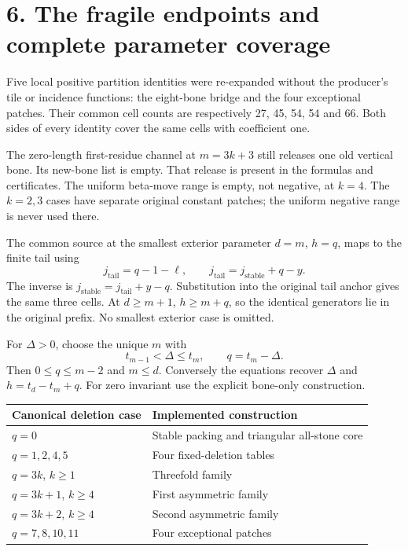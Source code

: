 \documentclass[
  11pt,
]{article}
\begin{document}
\section{6. The fragile endpoints and complete parameter
coverage}\label{the-fragile-endpoints-and-complete-parameter-coverage}

Five local positive partition identities were re-expanded without the
producer's tile or incidence functions: the eight-bone bridge and the
four exceptional patches. Their common cell counts are respectively 27,
45, 54, 54 and 66. Both sides of every identity cover the same cells
with coefficient one.

The zero-length first-residue channel at \(m=3k+3\) still releases one
old vertical bone. Its new-bone list is empty. That release is present
in the formulas and certificates. The uniform beta-move range is empty,
not negative, at \(k=4\). The \(k=2,3\) cases have separate original
constant patches; the uniform negative range is never used there.

The common source at the smallest exterior parameter \(d=m\), \(h=q\),
maps to the finite tail using \[
j_{\mathrm{tail}}=q-1-\ell,
\qquad
j_{\mathrm{tail}}=j_{\mathrm{stable}}+q-y.
\] The inverse is \(j_{\mathrm{stable}}=j_{\mathrm{tail}}+y-q\).
Substitution into the original tail anchor gives the same three cells.
At \(d\ge m+1\), \(h\ge m+q\), so the identical generators lie in the
original prefix. No smallest exterior case is omitted.

For \(\Delta>0\), choose the unique \(m\) with \[
t_{m-1}<\Delta\le t_m,
\qquad q=t_m-\Delta.
\] Then \(0\le q\le m-2\) and \(m\le d\). Conversely the equations
recover \(\Delta\) and \(h=t_d-t_m+q\). For zero invariant use the
explicit bone-only construction.

\begin{longtable}[]{@{}ll@{}}
\toprule\noalign{}
Canonical deletion case & Implemented construction \\
\midrule\noalign{}
\endhead
\bottomrule\noalign{}
\endlastfoot
\(q=0\) & Stable packing and triangular all-stone core \\
\(q=1,2,4,5\) & Four fixed-deletion tables \\
\(q=3k\), \(k\ge1\) & Threefold family \\
\(q=3k+1\), \(k\ge4\) & First asymmetric family \\
\(q=3k+2\), \(k\ge4\) & Second asymmetric family \\
\(q=7,8,10,11\) & Four exceptional patches \\
\end{longtable}
\end{document}
